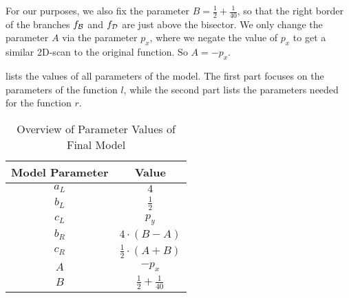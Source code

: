 For our purposes, we also fix the parameter $B = \frac{1}{2} + \frac{1}{40}$, so that the right border of the branches $f_{\mathcal{B}}$ and $f_{\mathcal{D}}$ are just above the bisector.
We only change the parameter $A$ via the parameter $p_x$, where we negate the value of $p_x$ to get a similar 2D-scan to the original function.
So $A = -p_x$.

 lists the values of all parameters of the model.
The first part focuses on the parameters of the function $l$, while the second part lists the parameters needed for the function $r$.

\begin{table}
    \centering
    \begin{tabular}{|c|c|}
        \hline
        Model Parameter & Value                        \\ \hline \hline
        $a_L$           & $4$                          \\ \hline
        $b_L$           & $\frac{1}{2}$                \\ \hline
        $c_L$           & $p_y$                        \\ \hline \hline
        $b_R$           & $4 \cdot (B - A)$            \\ \hline
        $c_R$           & $\frac{1}{2} \cdot (A + B)$  \\ \hline
        $A$             & $-p_x$                       \\ \hline
        $B$             & $\frac{1}{2} + \frac{1}{40}$ \\ \hline
    \end{tabular}
    \caption{Overview of Parameter Values of Final Model}
    \label{tab:final.def.parameters.overview}
\end{table}

